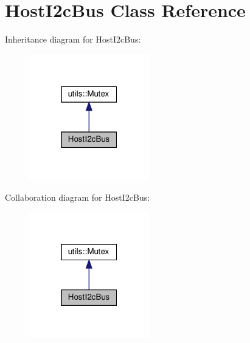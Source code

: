 \hypertarget{classHostI2cBus}{}\section{Host\+I2c\+Bus Class Reference}
\label{classHostI2cBus}


Inheritance diagram for Host\+I2c\+Bus\+:
\nopagebreak
\begin{figure}[H]
\begin{center}
\leavevmode
\includegraphics[width=148pt]{classHostI2cBus__inherit__graph}
\end{center}
\end{figure}


Collaboration diagram for Host\+I2c\+Bus\+:
\nopagebreak
\begin{figure}[H]
\begin{center}
\leavevmode
\includegraphics[width=148pt]{classHostI2cBus__coll__graph}
\end{center}
\end{figure}
